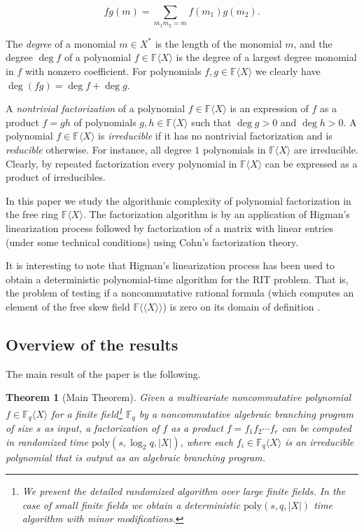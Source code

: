 \documentclass[10pt,a4paper]{article}
\newtheorem*{theorem*}{Theorem}
\newcommand{\F}{\mathbb{F}}
\renewcommand{\angle}[1]{\langle #1 \rangle}
\newcommand{\FX}{\F\angle{X}}
\newcommand{\poly}{\mathrm{poly}}
\newcommand{\skewf}{\mathbb{F}\newbrak{X}}
\newcommand{\newbrak}[1]{\mathopen{\langle\!\langle}#1\mathclose{\rangle\!\rangle}}
\begin{document}
\[
fg(m)=\sum_{m_1m_2=m} f(m_1)g(m_2).
\]

The \emph{degree} of a monomial $m\in X^*$ is the length of the
monomial $m$, and the degree $\deg f$ of a polynomial $f\in\FX$ is the
degree of a largest degree monomial in $f$ with nonzero coefficient.
For polynomials $f,g\in\FX$ we clearly have $\deg (fg) = \deg f + \deg
g$.

A \emph{nontrivial factorization} of a polynomial $f\in\FX$ is an
expression of $f$ as a product $f=gh$ of polynomials $g,h\in\FX$ such
that $\deg g > 0$ and $\deg h > 0$. A polynomial $f\in\FX$ is
\emph{irreducible} if it has no nontrivial factorization and is
\emph{reducible} otherwise.  For instance, all degree $1$ polynomials
in $\FX$ are irreducible. Clearly, by repeated factorization every
polynomial in $\FX$ can be expressed as a product of
irreducibles. 

In this paper we study the algorithmic complexity of polynomial
factorization in the free ring $\FX$. The factorization algorithm is
by an application of Higman's linearization process followed by
factorization of a matrix with linear entries (under some technical
conditions) using Cohn's factorization theory.

It is interesting to note that Higman's linearization process
\cite{Hig} has been used to obtain a deterministic polynomial-time
algorithm for the RIT problem. That is, the problem of testing if a
noncommutative rational formula (which computes an element of the free
skew field $\skewf$) is zero on its domain of definition
\cite{GGOW20,IQS17, IQS18,HW15}.

%

\subsection{Overview of the results}

The main result of the paper is the following.


\begin{theorem*}[Main Theorem]
Given a multivariate noncommutative polynomial $f\in\F_q\angle{X}$ for
a finite field\footnote{We present the detailed randomized algorithm
  over large finite fields. In the case of small finite fields we
  obtain a deterministic $\poly(s,q,|X|)$ time algorithm with minor
  modifications.} $\F_q$ by a
noncommutative algebraic branching program of size $s$ as input, a
factorization of $f$ as a product $f=f_1f_2\cdots f_r$ can be computed
in randomized time $\poly(s,\log_2q,|X|)$, where each
$f_i\in\F_q\angle{X}$ is an irreducible polynomial that is output as
an algebraic branching program.
\end{theorem*} 
\end{document}
